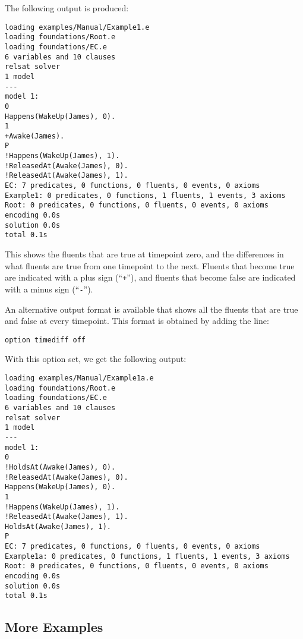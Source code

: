 \documentclass{article}
\begin{document}
The following output is produced:
\begin{verbatim}
loading examples/Manual/Example1.e
loading foundations/Root.e
loading foundations/EC.e
6 variables and 10 clauses
relsat solver
1 model
---
model 1:
0
Happens(WakeUp(James), 0).
1
+Awake(James).
P
!Happens(WakeUp(James), 1).
!ReleasedAt(Awake(James), 0).
!ReleasedAt(Awake(James), 1).
EC: 7 predicates, 0 functions, 0 fluents, 0 events, 0 axioms
Example1: 0 predicates, 0 functions, 1 fluents, 1 events, 3 axioms
Root: 0 predicates, 0 functions, 0 fluents, 0 events, 0 axioms
encoding 0.0s
solution 0.0s
total 0.1s
\end{verbatim}
This shows the fluents that are true at timepoint zero, and the
differences in what fluents are true from one timepoint to the next.
Fluents that become true are indicated with a plus sign (``{\tt +}''),
and fluents that become false are indicated with a minus sign
(``{\tt -}'').

An alternative output format is available that shows all the fluents
that are true and false at every timepoint. This format is obtained by
adding the line:
\begin{verbatim}
option timediff off
\end{verbatim}
With this option set, we get the following output:
\begin{verbatim}
loading examples/Manual/Example1a.e
loading foundations/Root.e
loading foundations/EC.e
6 variables and 10 clauses
relsat solver
1 model
---
model 1:
0
!HoldsAt(Awake(James), 0).
!ReleasedAt(Awake(James), 0).
Happens(WakeUp(James), 0).
1
!Happens(WakeUp(James), 1).
!ReleasedAt(Awake(James), 1).
HoldsAt(Awake(James), 1).
P
EC: 7 predicates, 0 functions, 0 fluents, 0 events, 0 axioms
Example1a: 0 predicates, 0 functions, 1 fluents, 1 events, 3 axioms
Root: 0 predicates, 0 functions, 0 fluents, 0 events, 0 axioms
encoding 0.0s
solution 0.0s
total 0.1s
\end{verbatim}

\subsection{More Examples}
\end{document}
